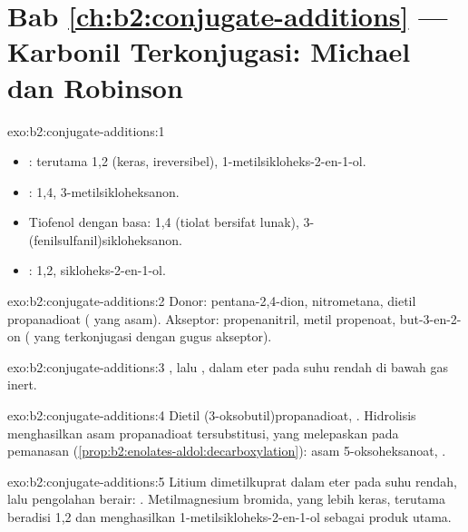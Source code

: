 \section*{Bab \ref{ch:b2:conjugate-additions} --- Karbonil Terkonjugasi: Michael dan Robinson}

\begin{solution}{exo:b2:conjugate-additions:1}
\begin{itemize}
  \item {}: terutama 1,2 (keras, ireversibel), 1-metilsikloheks-2-en-1-ol.
  \item {}: 1,4, 3-metilsikloheksanon.
  \item Tiofenol dengan basa: 1,4 (tiolat bersifat lunak), 3-(fenilsulfanil)sikloheksanon.
  \item {}: 1,2, sikloheks-2-en-1-ol.
\end{itemize}
\end{solution}

\begin{solution}{exo:b2:conjugate-additions:2}
Donor: pentana-2,4-dion, nitrometana, dietil propanadioat ( yang
asam). Akseptor: propenanitril, metil propenoat, but-3-en-2-on (
yang terkonjugasi dengan gugus akseptor).
\end{solution}

\begin{solution}{exo:b2:conjugate-additions:3}
, lalu , dalam eter pada
suhu rendah di bawah gas inert.
\end{solution}

\begin{solution}{exo:b2:conjugate-additions:4}
Dietil (3-oksobutil)propanadioat, . Hidrolisis
menghasilkan asam propanadioat tersubstitusi, yang melepaskan  pada
pemanasan (\cref{prop:b2:enolates-aldol:decarboxylation}):
asam 5-oksoheksanoat, .
\end{solution}

\begin{solution}{exo:b2:conjugate-additions:5}
Litium dimetilkuprat dalam eter pada suhu rendah, lalu pengolahan berair:
. Metilmagnesium bromida, yang lebih keras, terutama beradisi
1,2 dan menghasilkan 1-metilsikloheks-2-en-1-ol sebagai produk utama.
\end{solution}


